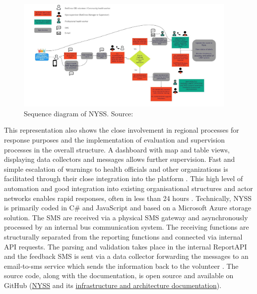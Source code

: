 \begin{figure}[!htp]
    \centering
    \includegraphics[width=0.95\textwidth]{figures/2023_MA_th_nyss_diagram.jpg}
    \decoRule
    \caption[Sequence diagram of NYSS]{Sequence diagram of NYSS. Source: \textcite{nrcWhatNyss2023}}
    \label{fig:th_nyss_diagram}
\end{figure}


This representation also shows the close involvement in regional processes for response purposes and the implementation of evaluation and supervision processes in the overall structure. A dashboard with map and table views, displaying data collectors and messages allows further supervision. Fast and simple escalation of warnings to health officials and other organizations is facilitated through their close integration into the platform \autocite{nrcNYSSCommunitybasedSurveillance2021,nrcWhatNyss2023}. This high level of automation and good integration into existing organisational structures and actor networks enables rapid responses, often in less than 24 hours \autocite{jungCommunityBasedSurveillance2022}.\newline
Technically, NYSS is primarily coded in C\# and JavaScript and based on a Microsoft Azure storage solution. The SMS are received via a physical SMS gateway and asynchronously processed by an internal bus communication system. The receiving functions are structurally separated from the reporting functions and connected via internal API requests. The parsing and validation takes place in the internal ReportAPI and the feedback SMS is sent via a data collector forwarding the messages to an email-to-sms service which sends the information back to the volunteer \autocite{nrcNyssToolDeveloped2023,nrcNYSSCommunitybasedSurveillance2021,nrcWhatNyss2023}. The source code, along with the documentation, is open source and available on GitHub (\href{https://github.com/nyss-platform-norcross/nyss}{NYSS} and its \href{https://github.com/nyss-platform-norcross/nyss/tree/master/Infrastructure}{infrastructure and architecture documentation}).

